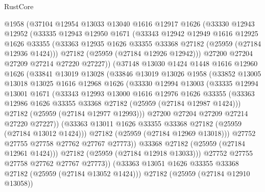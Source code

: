 \begin{lexlean}{RustCore}
\begin{coremodule}
        @1958
        (@37104
          @12954
          @13033
          @13040
          @1616
          @12917
          @1626
          (@33330
            @12943
            @12952
            (@33335
              @12943
              @12950
              @1671
              (@33343
                @12942
                @12949
                @1616
                @12925
                @1626
                @33355
                (@33363 @12935 @1626 @33355 @33368 @27182 (@25959 (@27184 @12936 @1424)))
                @27182
                (@25959 (@27184 @12926 @12942)))
              @27200
              @27204
              @27209
              @27214
              @27220
              @27227))
          (@37148
            @13030
            @1424
            @1448
            @1616
            @12960
            @1626
            (@33841
              @13019
              @13028
              (@33846
                @13019
                @13026
                @1958
                (@33852
                  @13005
                  @13018
                  @13025
                  @1616
                  @12968
                  @1626
                  (@33330
                    @12994
                    @13003
                    (@33335
                      @12994
                      @13001
                      @1671
                      (@33343
                        @12993
                        @13000
                        @1616
                        @12976
                        @1626
                        @33355
                        (@33363 @12986 @1626 @33355 @33368 @27182 (@25959 (@27184 @12987 @1424)))
                        @27182
                        (@25959 (@27184 @12977 @12993)))
                      @27200
                      @27204
                      @27209
                      @27214
                      @27220
                      @27227))
                  (@33363 @13011 @1626 @33355 @33368 @27182 (@25959 (@27184 @13012 @1424)))
                  @27182
                  (@25959 (@27184 @12969 @13018)))
                @27752
                @27755
                @27758
                @27762
                @27767
                @27773))
            @33368
            @27182
            (@25959 (@27184 @12961 @1424)))
          @27182
          (@25959 (@27184 @12918 @13033)))
        @27752
        @27755
        @27758
        @27762
        @27767
        @27773))
    (@33363 @13051 @1626 @33355 @33368 @27182 (@25959 (@27184 @13052 @1424)))
    @27182
    (@25959 (@27184 @12910 @13058))

\end{coremodule}
\end{lexlean}
